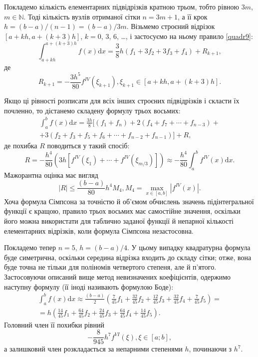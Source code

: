 \documentclass[14pt,twoside]{extreport}
\theoremstyle{mystyle}
\numberwithin{equation}{chapter}
\begin{document}
Покладемо кількість елементарних підвідрізків кратною трьом, тобто рівною $3m$, $m\in\mathbb{N}$. Тоді кількість вузлів отриманої сітки $n = 3m + 1$, а її крок $h = (b - a)/(n - 1) = (b - a)/3m$. Візьмемо строєний відрізок $[a + kh, a + (k + 3)h]$, $k = 0$, $3$, $6$, \ldots, і застосуємо на ньому правило \eqref{quadr9}:
\[
\int_{a+kh}^{a+(k+3)h}f(x)\mathrm{d}x=\frac{3}{8}h(f_{1}+3f_{2}+3f_{3}+f_{4})+R_{k+1},
\]
де
\[
R_{k+1}=-\frac{3h^{5}}{80}f^{IV}(\xi_{k+1}), \xi_{k+1}\in[a+kh, a+(k+3)h].
\]

Якщо ці рівності розписати для всіх інших строєних підвідрізків і скласти їх почленно, то дістанемо складену формулу трьох восьмих:
\begin{multline*}
\displaystyle \int_{a}^{b}f(x)\mathrm{d}x=\frac{3h}{8}[(f_{1}+f_{n})+2(f_{4}+f_{7}+\cdots+f_{n-3})+\\
+3(f_{2}+f_{3}+f_{5}+f_{6}+\cdots+f_{n-2}+f_{n-1})]+R,
\end{multline*}
де похибка $R$ поводиться у такий спосіб:
\[
R=-\displaystyle \frac{h^{4}}{80}(3h[f^{IV}(\xi_{1})+\cdots+f^{IV}(\xi_{m/3})])\approx-\frac{h^{4}}{80}\int_{a}^{b}f^{IV}(x)\mathrm{d}x.
\]
Мажорантна оцінка має вигляд
\[
|R|\leqslant\frac{(b-a)}{80}h^{4}M_{4}, M_{4}=\max\limits_{x\in[a,b]}|f^{IV}(x)|.
\]
Хоча формула Сімпсона за точністю й об'ємом обчислень значень підінтегральної функції є кращою, правило трьох восьмих має самостійне значення, оскільки його можна використати для таблично заданої функції й непарної кількості елементарних відрізків, коли формула Сімпсона незастосовна.

Покладемо тепер $n = 5$, $h = (b - a)/4$. У цьому випадку квадратурна формула буде симетрична, оскільки середина відрізка входить до складу сітки; отже, вона буде точна не тільки для поліномів четвертого степеня, але й п'ятого. Застосовуючи описаний вище метод невизначених коефіцієнтів, одержимо наступну формулу (її іноді називають формулою Боде):
\begin{multline*}
\displaystyle \int_{a}^{b}f(x)\mathrm{d}x\approx\frac{(b-a)}{2}\left(\frac{7}{45}f_{1}+\frac{32}{45}f_{2}+\frac{12}{45}f_{3}+\frac{32}{45}f_{4}+\frac{7}{45}f_{5}\right)=\\
=h\left(\frac{14}{45}f_{1}+\frac{64}{45}f_{2}+\frac{24}{45}f_{3}+\frac{64}{45}f_{4}+\frac{14}{45}f_{5}\right).
\end{multline*}
Головний член її похибки рівний
\[
-\frac{8}{945}h^{7}f^{VI}(\xi), \xi\in[a; b],
\]
а залишковий член розкладається за непарними степенями $h$, починаючи з $h^7$.
\end{document}
